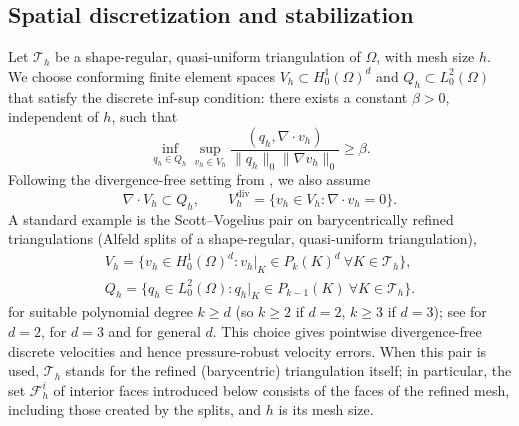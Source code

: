 \documentclass[11pt]{article}
\theoremstyle{remark}\newtheorem{remark}{Remark}
\newcommand{\Th}{\mathcal{T}_h}
\newcommand{\Vh}{V_h}\newcommand{\Qh}{Q_h}
\newcommand{\Vdivh}{V_h^{\mathrm{div}}}
\theoremstyle{plain}
\newcommand{\new}[1]{{\color{blue}#1}}
\begin{document}
\subsection{Spatial discretization and stabilization}
Let $\Th$ be a shape-regular, quasi-uniform triangulation of $\Omega$, with mesh size $h$. We choose conforming finite element spaces $\Vh\subset H^1_0(\Omega)^d$ and $\Qh\subset L^2_0(\Omega)$ that satisfy the discrete inf-sup condition: there exists a constant $\beta>0$, independent of $h$, such that
\[\inf_{q_h\in\Qh}\sup_{v_h\in\Vh}\frac{(q_h,\nabla\cdot v_h)}{\|q_h\|_0\|\nabla v_h\|_0}\ge\beta.\]
Following the divergence-free setting from \cite{BBCG24,GAN25}, we also assume
\[\nabla\cdot\Vh\subset\Qh,\qquad \Vdivh=\{v_h\in\Vh:\nabla\cdot v_h=0\}.\]
A standard example is the Scott--Vogelius pair on barycentrically refined triangulations (Alfeld splits of a shape-regular, quasi-uniform triangulation),
\begin{align*}
\Vh=\{v_h\in H^1_0(\Omega)^d:v_h|_K\in P_k(K)^d\ \forall K\in\Th\},\\ 
\Qh=\{q_h\in L^2_0(\Omega):q_h|_K\in P_{k-1}(K)\ \forall K\in\Th\}.
\end{align*}
for suitable polynomial degree $k\ge d$ (so $k\ge2$ if $d=2$, $k\ge3$ if $d=3$); see \cite{AQ92} for $d=2$, \cite{Zha05} for $d=3$ and \cite{GN18} for general $d$. This choice gives pointwise divergence-free discrete velocities and hence pressure-robust velocity errors. \new{When this pair is used, $\Th$ stands for the refined (barycentric) triangulation itself; in particular, the set $\mathcal F_h^i$ of interior faces introduced below consists of the faces of the refined mesh, including those created by the splits, and $h$ is its mesh size.}
\end{document}
